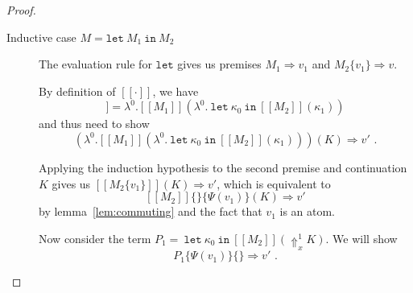 \documentclass[a4paper,11pt,draft]{article}
\newcommand{\kw}[1]{\mathtt{#1}}
\begin{document}
\begin{proof}
\begin{description}



\item[\sffamily Inductive case $M = \kw{let} \: M_{1} \: \kw{in} \: M_{2}$]\hfill

The evaluation rule for $\kw{let}$ gives us premises $M_{1} \Rightarrow v_{1}$ and $M_{2}\{v_{1}\} \Rightarrow v$.

By definition of $[\![\cdot]\!]$, we have
\begin{equation*}
  [\![\kw{let} \: M_{1} \: \kw{in} \: M_{2}]\!]
  = \lambda^{0}.[\![M_{1}]\!](\lambda^{0}. \: \kw{let} \: \kappa_{0} \: \kw{in} \: [\![M_{2}]\!](\kappa_{1}))
\end{equation*}
and thus need to show
\begin{equation}\label{eq:letresult}
  (\lambda^{0}.[\![M_{1}]\!](\lambda^{0}. \: \kw{let} \: \kappa_{0} \: \kw{in} \: [\![M_{2}]\!](\kappa_{1})))(K)
  \Rightarrow v' \text{ .}
\end{equation}

Applying the induction hypothesis to the second premise and continuation $K$ gives us
$[\![M_{2}\{v_{1}\}]\!](K) \Rightarrow v'$, which is equivalent to
\begin{equation}\label{eq:letsecondprem} %
  [\![M_{2}]\!]\{\}\{\Psi(v_{1})\}(K) \Rightarrow v'
\end{equation}
by lemma~\ref{lem:commuting} and the fact that $v_{1}$ is an atom.

Now consider the term $P_{1} = \: \kw{let} \: \kappa_{0} \: \kw{in} \: [\![M_{2}]\!](\Uparrow_{x}^{1} K)$. We
will show
\begin{equation}\label{eq:letp1}
  P_{1}\{\Psi(v_{1})\}\{\} \Rightarrow v' \text{ .}
\end{equation}


\end{description}
\end{proof}
\end{document}
